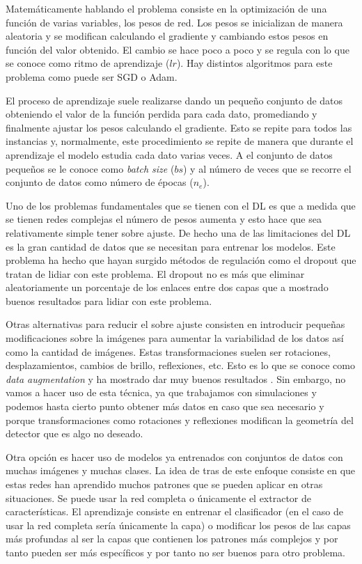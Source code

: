 \documentclass[a4paper,12pt,twoside,titlepage]{article}
\begin{document}
Matemáticamente hablando el problema consiste en la optimización de una función de varias variables, los pesos de red. Los pesos se inicializan de manera aleatoria y se modifican calculando el gradiente y cambiando estos pesos en función del valor obtenido. El cambio se hace poco a poco y se regula con lo que se conoce como ritmo de aprendizaje ($lr$). Hay distintos algoritmos para este problema como puede ser SGD o Adam.

El proceso de aprendizaje suele realizarse dando un pequeño conjunto de datos obteniendo el valor de la función perdida para cada dato, promediando y finalmente ajustar los pesos calculando el gradiente. Esto se repite para todos las instancias y, normalmente, este procedimiento se repite de manera que durante el aprendizaje el modelo estudia cada dato varias veces. A el conjunto de datos pequeños se le conoce como \textit{batch size} ($bs$) y al número de veces que se recorre el conjunto de datos como número de épocas ($n_e$).

Uno de los problemas fundamentales que se tienen con el DL es que a medida que se tienen redes complejas el número de pesos aumenta y esto hace que sea relativamente simple tener sobre ajuste. De hecho una de las limitaciones del DL es la gran cantidad de datos que se necesitan para entrenar los modelos. Este problema ha hecho que hayan surgido métodos de regulación como el dropout que tratan de lidiar con este problema. El dropout no es más que eliminar aleatoriamente un porcentaje de los enlaces entre dos capas que a mostrado buenos resultados para lidiar con este problema.

Otras alternativas para reducir el sobre ajuste consisten en introducir pequeñas modificaciones sobre la imágenes para aumentar la variabilidad de los datos así como la cantidad de imágenes. Estas transformaciones suelen ser rotaciones, desplazamientos, cambios de brillo, reflexiones, etc. Esto es lo que se conoce como \textit{data augmentation} y ha mostrado dar muy buenos resultados \cite{dataaug}. Sin embargo, no vamos a hacer uso de esta técnica, ya que trabajamos con simulaciones y podemos hasta cierto punto obtener más datos en caso que sea necesario y porque transformaciones como rotaciones y reflexiones modifican la geometría del detector que es algo no deseado.

Otra opción es hacer uso de modelos ya entrenados con conjuntos de datos con muchas imágenes y muchas clases. La idea de tras de este enfoque consiste en que estas redes han aprendido muchos patrones que se pueden aplicar en otras situaciones. Se puede usar la red completa o únicamente el extractor de características. El aprendizaje consiste en entrenar el clasificador (en el caso de usar la red completa sería únicamente la capa) o modificar los pesos de las capas más profundas al ser la capas que contienen los patrones más complejos y por tanto pueden ser más específicos y por tanto no ser buenos para otro problema.
\end{document}
